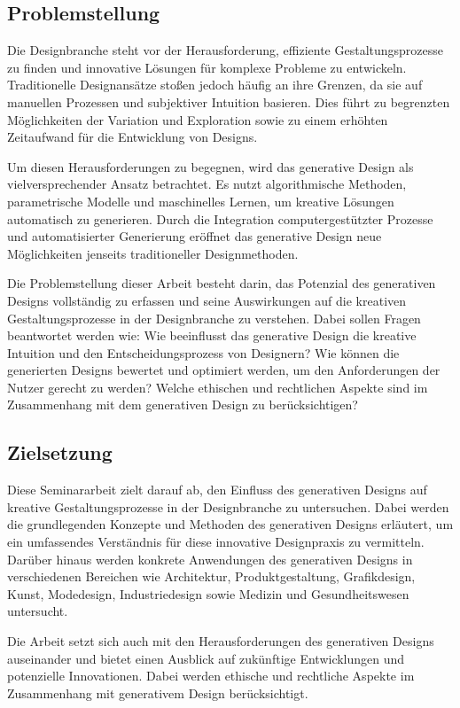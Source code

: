 \subsection*{Problemstellung}

Die Designbranche steht vor der Herausforderung, effiziente Gestaltungsprozesse zu finden und innovative Lösungen für komplexe Probleme zu entwickeln. Traditionelle Designansätze stoßen jedoch häufig an ihre Grenzen, da sie auf manuellen Prozessen und subjektiver Intuition basieren. Dies führt zu begrenzten Möglichkeiten der Variation und Exploration sowie zu einem erhöhten Zeitaufwand für die Entwicklung von Designs.

Um diesen Herausforderungen zu begegnen, wird das generative Design als vielversprechender Ansatz betrachtet. Es nutzt algorithmische Methoden, parametrische Modelle und maschinelles Lernen, um kreative Lösungen automatisch zu generieren. Durch die Integration computergestützter Prozesse und automatisierter Generierung eröffnet das generative Design neue Möglichkeiten jenseits traditioneller Designmethoden.

Die Problemstellung dieser Arbeit besteht darin, das Potenzial des generativen Designs vollständig zu erfassen und seine Auswirkungen auf die kreativen Gestaltungsprozesse in der Designbranche zu verstehen. Dabei sollen Fragen beantwortet werden wie: Wie beeinflusst das generative Design die kreative Intuition und den Entscheidungsprozess von Designern? Wie können die generierten Designs bewertet und optimiert werden, um den Anforderungen der Nutzer gerecht zu werden? Welche ethischen und rechtlichen Aspekte sind im Zusammenhang mit dem generativen Design zu berücksichtigen?


\subsection*{Zielsetzung}

Diese Seminararbeit zielt darauf ab, den Einfluss des generativen Designs auf kreative Gestaltungsprozesse in der Designbranche zu untersuchen. Dabei werden die grundlegenden Konzepte und Methoden des generativen Designs erläutert, um ein umfassendes Verständnis für diese innovative Designpraxis zu vermitteln. Darüber hinaus werden konkrete Anwendungen des generativen Designs in verschiedenen Bereichen wie Architektur, Produktgestaltung, Grafikdesign, Kunst, Modedesign, Industriedesign sowie Medizin und Gesundheitswesen untersucht.

Die Arbeit setzt sich auch mit den Herausforderungen des generativen Designs auseinander und bietet einen Ausblick auf zukünftige Entwicklungen und potenzielle Innovationen. Dabei werden ethische und rechtliche Aspekte im Zusammenhang mit generativem Design berücksichtigt.


